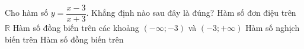 \begin{ex}%
	Cho hàm số $y=\dfrac{x-3}{x+3}$. Khẳng định nào sau đây là đúng?
	\choice
	{Hàm số đơn điệu trên $\mathbb{R}$}
	{\True Hàm số đồng biến trên các khoảng $(-\infty;-3)$ và $(-3;+\infty)$}
	{Hàm số nghịch biến trên}
	{Hàm số đồng biến trên}
\end{ex}
